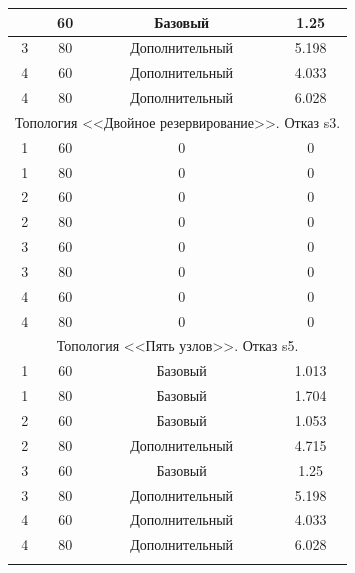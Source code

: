\documentclass[12pt, a4paper]{article}
\begin{document}
\begin{longtable}[h!]{|c|c|c|c|}
{\begin{tabular}{|c|c|c|c|}
			3 & 60 & Базовый & 1.25 \\ \hline
			3 & 80 & Дополнительный & 5.198 \\ \hline
			4 & 60 & Дополнительный & 4.033 \\ \hline
			4 & 80 & Дополнительный & 6.028 \\ \hline
			\multicolumn{4}{|c|}{Топология <<Двойное резервирование>>. Отказ s3.} \\ \hline
			1 & 60 & 0 & 0 \\ \hline
			1 & 80 & 0 & 0 \\ \hline
			2 & 60 & 0 & 0 \\ \hline
			2 & 80 & 0 & 0 \\ \hline
			3 & 60 & 0 & 0 \\ \hline
			3 & 80 & 0 & 0 \\ \hline
			4 & 60 & 0 & 0 \\ \hline
			4 & 80 & 0 & 0 \\ \hline
			\multicolumn{4}{|c|}{Топология <<Пять узлов>>. Отказ s5.} \\ \hline
			1 & 60 & Базовый & 1.013 \\ \hline
			1 & 80 & Базовый & 1.704 \\ \hline
			2 & 60 & Базовый & 1.053 \\ \hline
			2 & 80 & Дополнительный & 4.715 \\ \hline
			3 & 60 & Базовый & 1.25 \\ \hline
			3 & 80 & Дополнительный & 5.198 \\ \hline
			4 & 60 & Дополнительный & 4.033 \\ \hline
			4 & 80 & Дополнительный & 6.028 \\ \hline
		\end{tabular}%
	}
\end{longtable}
\end{document}
